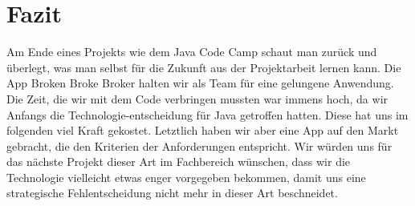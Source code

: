 \documentclass[10pt]{scrartcl}
\begin{document}
	
	
	
\section{Fazit}

Am Ende eines Projekts wie dem Java Code Camp schaut man zurück und überlegt, was man selbst für die Zukunft aus der Projektarbeit lernen kann. Die App Broken Broke Broker halten wir als Team für eine gelungene Anwendung. Die Zeit, die wir mit dem Code verbringen mussten war immens hoch, da wir Anfangs die Technologie-entscheidung für Java getroffen hatten. Diese hat uns im folgenden viel Kraft gekostet. Letztlich haben wir aber eine App auf den Markt gebracht, die den Kriterien der Anforderungen entspricht. Wir würden uns für das nächste Projekt dieser Art im Fachbereich wünschen, dass wir die Technologie vielleicht etwas enger vorgegeben bekommen, damit uns eine strategische Fehlentscheidung nicht mehr in dieser Art beschneidet.
\end{document}
